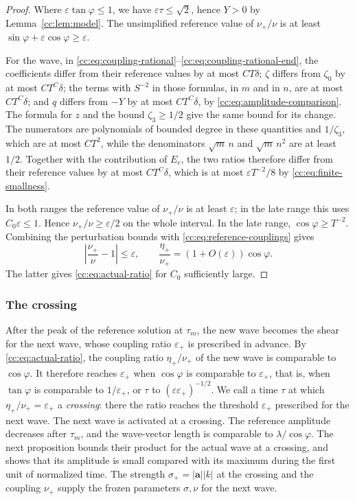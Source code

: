 \begin{proof}
Where $\varepsilon\tan\varphi\le1$, we have $\varepsilon\tau\le\sqrt2$, hence $Y>0$ by
Lemma~\ref{cc:lem:model}. The unsimplified reference value of
$\nu_+/\nu$ is at least $\sin\varphi+\varepsilon\cos\varphi
\ge\varepsilon$.

For the wave, in
\eqref{cc:eq:coupling-rational}--\eqref{cc:eq:coupling-rational-end},
the coefficients differ from their reference values by at most
$CT\delta$; $\zeta$ differs from $\zeta_0$ by at most $CT^C\delta$;
the terms with $S^{-2}$ in those formulas, in $m$ and in $n$, are at
most $CT^C\delta$; and $q$ differs from $-Y$ by at most $CT^C\delta$,
by \eqref{cc:eq:amplitude-comparison}. The formula for $z$ and the
bound $\zeta_3\ge1/2$ give the same bound for its change.
The numerators are polynomials of bounded degree in these quantities
and $1/\zeta_3$, which are at most $CT^2$, while the denominators
$\sqrt m\,n$ and $\sqrt m\,n^2$ are at least $1/2$.
Together with the contribution of $E_c$, the two ratios therefore
differ from their reference values by at most $CT^C\delta$, which is
at most $\varepsilon T^{-2}/8$ by \eqref{cc:eq:finite-smallness}.

In both ranges the reference value of $\nu_+/\nu$ is at least
$\varepsilon$; in the late range this uses $C_0\varepsilon\le1$.
Hence $\nu_+/\nu\ge\varepsilon/2$ on the whole interval. In the late
range, $\cos\varphi\ge T^{-2}$. Combining the perturbation bounds with
\eqref{cc:eq:reference-couplings} gives
\[
 \left|\frac{\nu_+}{\nu}-1\right|\le\varepsilon,\qquad
 \frac{\eta_+}{\nu_+}=(1+O(\varepsilon))\cos\varphi.
\]
The latter gives \eqref{cc:eq:actual-ratio} for $C_0$ sufficiently large.
\end{proof}

\subsubsection{The crossing}
After the peak of the reference solution at $\tau_m$, the new wave
becomes the shear for the next wave, whose coupling ratio
$\varepsilon_+$ is prescribed in advance. By
\eqref{cc:eq:actual-ratio}, the coupling ratio $\eta_+/\nu_+$ of the
new wave is comparable to $\cos\varphi$. It therefore reaches
$\varepsilon_+$ when $\cos\varphi$ is comparable to $\varepsilon_+$,
that is, when $\tan\varphi$ is comparable to $1/\varepsilon_+$, or
$\tau$ to $(\varepsilon\varepsilon_+)^{-1/2}$.
We call a time $\tau$ at which $\eta_+/\nu_+=\varepsilon_+$ a
\emph{crossing}: there the ratio reaches the threshold $\varepsilon_+$
prescribed for the next wave. The next wave is activated at a crossing. The reference
amplitude decreases after $\tau_m$, and the wave-vector length is
comparable to $\lambda/\cos\varphi$. The next proposition bounds their
product for the actual wave at a crossing, and shows that its amplitude
is small compared with its maximum during the first unit of normalized
time. The strength $\sigma_+=|\mathbf a||k|$ at the crossing and the
coupling $\nu_+$ supply the frozen parameters $\sigma,\nu$ for the next
wave.

